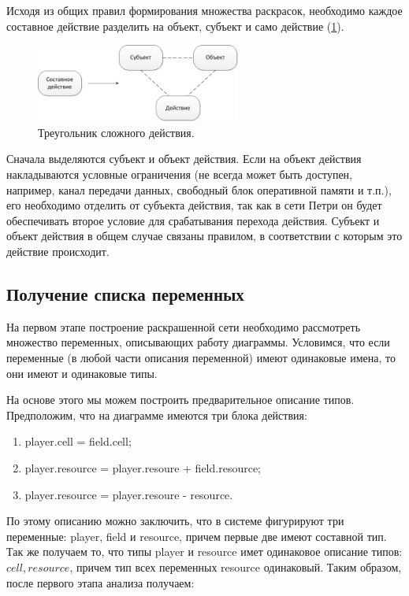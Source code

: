 Исходя из общих правил формирования множества раскрасок, необходимо каждое составное действие разделить на объект, субъект и само действие (\ref{fig:fig4}).

\begin{figure}
	\begin{center}
		\includegraphics[width=0.6\textwidth]{include/CompositeActivity.png}
	\end{center}
	\caption{Треугольник сложного действия.}
	\label{fig:fig4}
\end{figure}

Сначала выделяются субъект и объект действия. Если на объект действия накладываются условные ограничения (не всегда может быть доступен, например, канал передачи данных, свободный блок оперативной памяти и т.п.), его необходимо отделить от субъекта действия, так как в сети Петри он будет обеспечивать второе условие для срабатывания перехода действия. Субъект и объект действия в общем случае связаны правилом, в соответствии с которым это действие происходит. \cite{Korotkov} 

\subsection{Получение списка переменных}

На первом этапе построение раскрашенной сети необходимо рассмотреть множество переменных, описывающих работу диаграммы. Условимся, что если переменные (в любой части описания переменной) имеют одинаковые имена, то они имеют и одинаковые типы.

На основе этого мы можем построить предварительное описание типов. Предположим, что на диаграмме имеются три блока действия:
\begin{enumerate}
\item[1.] player.cell = field.cell;
\item[2.] player.resource = player.resoure + field.resource;
\item[3.] player.resource = player.resoure - resource.
\end{enumerate}

По этому описанию можно заключить, что в системе фигурируют три переменные: player, field и resource, причем первые две имеют составной тип. Так же получаем то, что типы player и resource имет одинаковое описание типов: $ { cell, resource } $, причем тип всех переменных resource одинаковый. Таким образом, после первого этапа анализа получаем:

